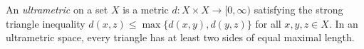
An \emph{ultrametric} on a set $X$ is a metric $d:X\times X\to[0,\infty)$ satisfying the strong triangle inequality $d(x,z)\le\max\{d(x,y),d(y,z)\}$ for all $x,y,z\in X$. In an ultrametric space, every triangle has at least two sides of equal maximal length.
